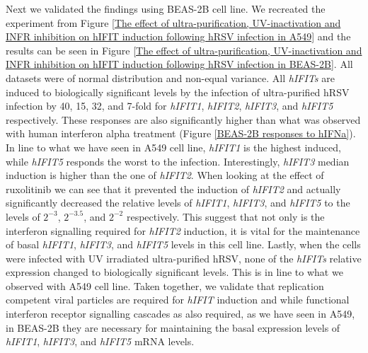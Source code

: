 Next we validated the findings using BEAS-2B cell line. We recreated the experiment from Figure \ref{The effect of ultra-purification, UV-inactivation and INFR inhibition on hIFIT induction following hRSV infection in A549} and the results can be seen in Figure \ref{The effect of ultra-purification, UV-inactivation and INFR inhibition on hIFIT induction following hRSV infection in BEAS-2B}. All datasets were of normal distribution and non-equal variance. All \textit{hIFITs} are induced to biologically significant levels by the infection of ultra-purified hRSV infection by 40, 15, 32, and 7-fold for \textit{hIFIT1}, \textit{hIFIT2}, \textit{hIFIT3}, and \textit{hIFIT5} respectively. These responses are also significantly higher than what was observed with human interferon alpha treatment (Figure \ref{BEAS-2B responses to hIFNa}). In line to what we have seen in A549 cell line, \textit{hIFIT1} is the highest induced, while \textit{hIFIT5} responds the worst to the infection. Interestingly, \textit{hIFIT3} median induction is higher than the one of \textit{hIFIT2}. When looking at the effect of ruxolitinib we can see that it prevented the induction of \textit{hIFIT2} and actually significantly decreased the relative levels of \textit{hIFIT1}, \textit{hIFIT3}, and \textit{hIFIT5} to the levels of \(2^{-3}\), \(2^{-3.5}\), and \(2^{-2}\) respectively. This suggest that not only is the interferon signalling required for \textit{hIFIT2} induction, it is vital for the maintenance  of basal \textit{hIFIT1}, \textit{hIFIT3}, and \textit{hIFIT5} levels in this cell line. Lastly, when the cells were infected with UV irradiated ultra-purified hRSV, none of the \textit{hIFITs} relative expression changed to biologically significant levels. This is in line to what we observed with A549 cell line. Taken together, we validate that replication competent viral particles are required for \textit{hIFIT} induction and while functional interferon receptor signalling cascades as also required, as we have seen in A549, in BEAS-2B they are necessary for maintaining the basal expression levels of \textit{hIFIT1}, \textit{hIFIT3}, and \textit{hIFIT5} mRNA levels.


